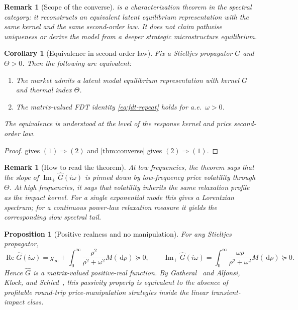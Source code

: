 \documentclass[11pt]{article}
\newtheorem{corollary}[theorem]{Corollary}
\newtheorem{remark}[theorem]{Remark}
\newtheorem{proposition}[theorem]{Proposition}
\newcommand{\Ghat}{\widehat{G}}
\newcommand{\RePart}{\operatorname{Re}}
\newcommand{\ImPart}{\operatorname{Im}_{\!+}}
\newcommand{\dd}{\,\mathrm{d}}
\begin{document}
\begin{remark}[Scope of the converse]
 is a characterization theorem in the spectral category: it reconstructs an equivalent latent equilibrium representation with the same kernel and the same second-order law. It does not claim pathwise uniqueness or derive the model from a deeper strategic microstructure equilibrium.
\end{remark}

\begin{corollary}[Equivalence in second-order law]\label{cor:fdt-equivalence}
Fix a Stieltjes propagator $G$ and $\Theta>0$. Then the following are equivalent:
\begin{enumerate}[label=\arabic*.]
  \item The market admits a latent modal equilibrium representation with kernel $G$ and thermal index $\Theta$.
  \item The matrix-valued FDT identity \cref{eq:fdt-repeat} holds for a.e.\ $\omega>0$.
\end{enumerate}
The equivalence is understood at the level of the response kernel and price second-order law.
\end{corollary}

\begin{proof}
 gives $(1)\Rightarrow(2)$ and \cref{thm:converse} gives $(2)\Rightarrow(1)$.
\end{proof}

\begin{remark}[How to read the theorem]
At low frequencies, the theorem says that the slope of $\ImPart \Ghat(i\omega)$ is pinned down by low-frequency price volatility through $\Theta$. At high frequencies, it says that volatility inherits the same relaxation profile as the impact kernel. For a single exponential mode this gives a Lorentzian spectrum; for a continuous power-law relaxation measure it yields the corresponding slow spectral tail.
\end{remark}

\begin{proposition}[Positive realness and no manipulation]\label{prop:passive}
For any Stieltjes propagator,
\[
  \RePart \Ghat(i\omega)=g_\infty+\int_0^\infty \frac{\rho^2}{\rho^2+\omega^2}M(\dd\rho)\succeq 0,
  \qquad
  \ImPart \Ghat(i\omega)=\int_0^\infty \frac{\omega\rho}{\rho^2+\omega^2}M(\dd\rho)\succeq 0.
\]
Hence $\Ghat$ is a matrix-valued positive-real function. By Gatheral~\cite{Gatheral2010} and Alfonsi, Klock, and Schied~\cite{AlfonsiKlockSchied2016}, this passivity property is equivalent to the absence of profitable round-trip price-manipulation strategies inside the linear transient-impact class.
\end{proposition}
\end{document}
